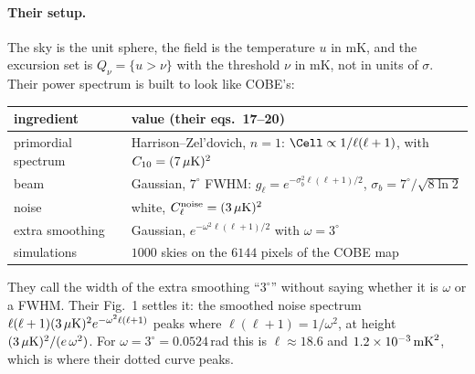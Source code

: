 \paragraph{Their setup.} The sky is the unit sphere, the field is the temperature $u$ in mK, and the excursion
set is $Q_\nu=\{u>\nu\}$ with the threshold $\nu$ in mK, not in units of $\sigma$. Their power spectrum is
built to look like COBE's:
\begin{center}
\small
\begin{tabular}{ll}
\toprule
ingredient & value (their eqs.~17--20)\\
\midrule
primordial spectrum & Harrison--Zel'dovich, $n=1$: $\Cell\propto1/\ell(\ell+1)$, with $C_{10}=(7\,\mu{\rm K})^2$\\
beam & Gaussian, $7^\circ$ FWHM: $g_\ell=e^{-\sigma_b^2\ell(\ell+1)/2}$, $\sigma_b=7^\circ/\sqrt{8\ln2}$\\
noise & white, $C_\ell^{\rm noise}=(3\,\mu{\rm K})^2$\\
extra smoothing & Gaussian, $e^{-\omega^2\ell(\ell+1)/2}$ with $\omega=3^\circ$\\
simulations & $1000$ skies on the $6144$ pixels of the COBE map\\
\bottomrule
\end{tabular}
\end{center}
They call the width of the extra smoothing ``$3^\circ$'' without saying whether it is $\omega$ or a FWHM. Their
Fig.~1 settles it: the smoothed noise spectrum $\ell(\ell+1)(3\,\mu{\rm K})^2e^{-\omega^2\ell(\ell+1)}$ peaks where
$\ell(\ell+1)=1/\omega^2$, at height $(3\,\mu{\rm K})^2/(e\,\omega^2)$. For $\omega=3^\circ=0.0524$\,rad this is
$\ell\approx18.6$ and $1.2\times10^{-3}\,{\rm mK}^2$, which is where their dotted curve peaks.

